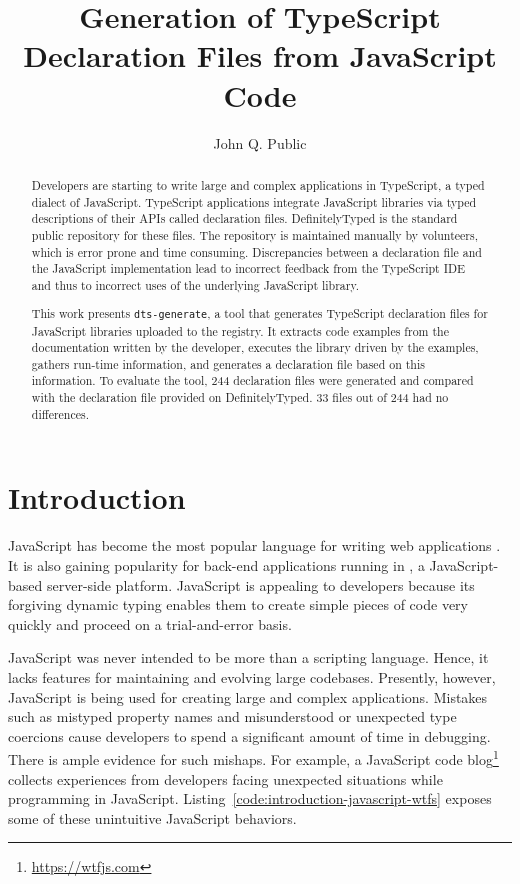 \documentclass[a4paper,english,cleveref, autoref]{lipics-v2019}
\title{Generation of TypeScript Declaration Files from JavaScript Code}
\author{John Q. Public}{Dummy University Computing Laboratory, Country \and My second affiliation, Country \and \url{http://www.myhomepage.edu} }{johnqpublic@dummyuni.org}{https://orcid.org/0000-0002-1825-0097}{(Optional) author-specific funding acknowledgements}%
\newcommand{\coderef}[1]{Listing~\ref{#1}}
\begin{document}
\maketitle

\begin{abstract}
Developers are starting to write large and complex applications in
TypeScript, a typed dialect of JavaScript. TypeScript applications
integrate JavaScript libraries via typed descriptions of their APIs
called declaration files. DefinitelyTyped is the standard public
repository for these files.
The repository is maintained manually by volunteers, which
is error prone and time consuming. Discrepancies between a
declaration file and the JavaScript implementation lead to
incorrect feedback from the TypeScript IDE and thus to incorrect uses
of the underlying JavaScript library.

This work presents \texttt{dts-generate}, a tool that generates
TypeScript declaration files for JavaScript libraries uploaded to the \NPM{}
registry. It extracts code examples from the documentation written by
the developer, executes the library driven by the examples, gathers
run-time information, and generates a declaration file based on this
information. To evaluate the tool, 244 declaration files were generated and 
compared with the declaration file provided on DefinitelyTyped.
33 files out of 244 had no differences.
\end{abstract}

\section{Introduction}
\label{sec:introduction}
JavaScript has become the most popular language for writing web
applications \cite{github-statistics}. It is also gaining popularity
for back-end applications running in \NodeJS{}, a JavaScript-based
server-side platform. JavaScript is appealing to developers because
its forgiving dynamic typing enables 
them to create simple pieces of code very quickly and proceed on a
trial-and-error basis.

JavaScript was never intended to be more than a
scripting language. Hence, it lacks features for maintaining and evolving large
codebases.
Presently, however, JavaScript is being used for creating large and complex
applications. 
Mistakes such as mistyped property
names and misunderstood or unexpected type coercions cause developers
to spend a significant amount of time in debugging. There is ample
evidence for such mishaps. For example, a 
JavaScript code blog\footnote{\url{https://wtfjs.com}} collects experiences
from developers facing unexpected situations while programming in
JavaScript. \coderef{code:introduction-javascript-wtfs} exposes some
of these unintuitive JavaScript behaviors. 
\end{document}
